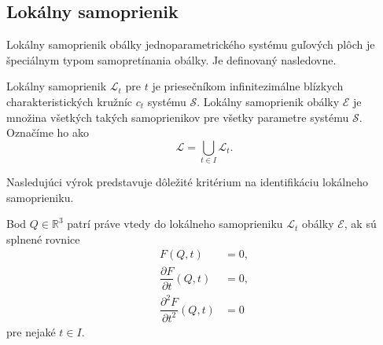 \subsection{Lokálny samoprienik}
Lokálny samoprienik obálky jednoparametrického systému guľových plôch je špeciálnym typom samopretínania obálky. Je definovaný nasledovne.
\begin{definition} \label{definicia lokalny samoprienik}
Lokálny samoprienik $\mathcal{L}_{t}$ pre $t$ je priesečníkom infinitezimálne blízkych charakteristických kružníc $c_{t}$ systému $\mathcal{S}$. Lokálny samoprienik obálky $\mathcal{E}$ je množina všetkých takých samoprienikov pre všetky parametre systému $\mathcal{S}$. Označíme ho ako $$\mathcal{L} = \bigcup_{t \in I} \mathcal{L}_t.$$
\end{definition}

Nasledujúci výrok predstavuje dôležité kritérium na identifikáciu lokálneho samoprieniku.
\begin{lemma} \label{kriterium o lokalnom samoprieniku}
Bod $Q \in \mathbb{R}^3$ patrí práve vtedy do lokálneho samoprieniku $\mathcal{L}_{t}$ obálky $\mathcal{E}$, ak sú splnené rovnice
\begin{align*}
F(Q,t) &= 0, \\
\dfrac{\partial F}{\partial t}(Q,t) &= 0, \\
\dfrac{\partial^2 F}{\partial t^2}(Q,t) &= 0
\end{align*}
pre nejaké $t \in I.$
\end{lemma}

